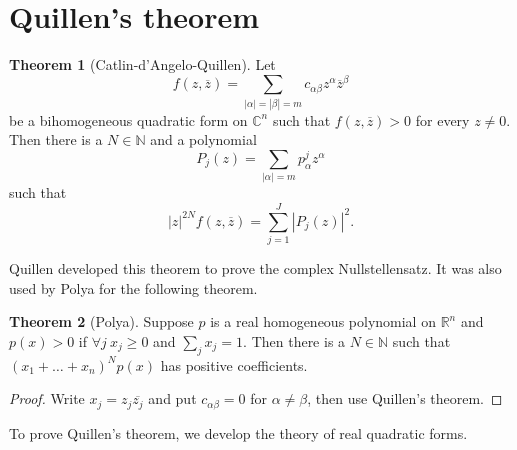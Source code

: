 \documentclass[12pt]{report}
\newcommand{\NN}{\mathbb{N}}
\newcommand{\RR}{\mathbb{R}}
\newcommand{\CC}{\mathbb{C}}
\theoremstyle{definition}
\newtheorem{theorem}{Theorem}[chapter]
\begin{document}
\section{Quillen's theorem}
\begin{theorem}[Catlin-d'Angelo-Quillen]
    Let
    $$f(z, \overline z) = \sum_{|\alpha| = |\beta| = m} c_{\alpha\beta} z^\alpha \overline z^\beta$$
    be a bihomogeneous quadratic form on $\CC^n$ such that $f(z, \overline z) > 0$ for every $z \neq 0$. Then there is a $N \in \NN$ and a polynomial
    $$P_j(z) = \sum_{|\alpha| = m} p_\alpha^j z^\alpha$$
    such that
    $$|z|^{2N} f(z, \overline z) = \sum_{j=1}^J |P_j(z)|^2.$$
\end{theorem}
    Quillen developed this theorem to prove the complex Nullstellensatz. It was also used by Polya for the following theorem.
\begin{theorem}[Polya]
    Suppose $p$ is a real homogeneous polynomial on $\RR^n$ and $p(x) > 0$ if $\forall j ~x_j \geq 0$ and $\sum_j x_j = 1$. Then there is a $N \in \NN$ such that $(x_1 + \dots + x_n)^Np(x)$ has positive coefficients.
\end{theorem}
\begin{proof}
    Write $x_j = z_j \overline{z_j}$ and put $c_{\alpha\beta} = 0$ for $\alpha \neq \beta$, then use Quillen's theorem.
\end{proof}
    To prove Quillen's theorem, we develop the theory of real quadratic forms.
\end{document}
